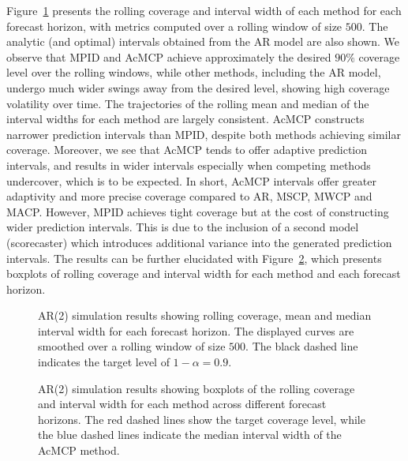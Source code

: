 \documentclass[
  11pt,
  a4paper,
]{article}
\theoremstyle{plain}
\theoremstyle{remark}
\begin{document}
Figure~\ref{fig-AR2_cov} presents the rolling coverage and interval
width of each method for each forecast horizon, with metrics computed
over a rolling window of size \(500\). The analytic (and optimal)
intervals obtained from the AR model are also shown. We observe that
MPID and AcMCP achieve approximately the desired \(90\%\) coverage level
over the rolling windows, while other methods, including the AR model,
undergo much wider swings away from the desired level, showing high
coverage volatility over time. The trajectories of the rolling mean and
median of the interval widths for each method are largely consistent.
AcMCP constructs narrower prediction intervals than MPID, despite both
methods achieving similar coverage. Moreover, we see that AcMCP tends to
offer adaptive prediction intervals, and results in wider intervals
especially when competing methods undercover, which is to be expected.
In short, AcMCP intervals offer greater adaptivity and more precise
coverage compared to AR, MSCP, MWCP and MACP. However, MPID achieves
tight coverage but at the cost of constructing wider prediction
intervals. This is due to the inclusion of a second model (scorecaster)
which introduces additional variance into the generated prediction
intervals. The results can be further elucidated with
Figure~\ref{fig-AR2_box}, which presents boxplots of rolling coverage
and interval width for each method and each forecast horizon.

\begin{figure}


\caption{\label{fig-AR2_cov}AR(2) simulation results showing rolling
coverage, mean and median interval width for each forecast horizon. The
displayed curves are smoothed over a rolling window of size \(500\). The
black dashed line indicates the target level of \(1-\alpha=0.9\).}

\end{figure}%

\begin{figure}


\caption{\label{fig-AR2_box}AR(2) simulation results showing boxplots of
the rolling coverage and interval width for each method across different
forecast horizons. The red dashed lines show the target coverage level,
while the blue dashed lines indicate the median interval width of the
AcMCP method.}

\end{figure}%
\end{document}

